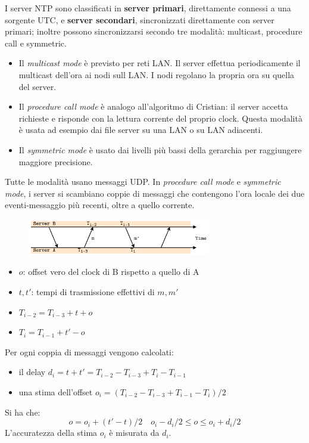 I server NTP sono classificati in \textbf{server primari}, direttamente connessi a una sorgente UTC, e \textbf{server secondari}, sincronizzati direttamente con server primari; inoltre possono sincronizzarsi secondo tre modalità: multicast, procedure call e symmetric.
\begin{itemize}
    \item Il \textit{multicast mode} è previsto per reti LAN. Il server effettua periodicamente il multicast dell'ora ai nodi sull LAN. I nodi regolano la propria ora su quella del server.
    \item Il \textit{procedure call mode} è analogo all'algoritmo di Cristian: il server accetta richieste e risponde con la lettura corrente del proprio clock. Questa modalità è usata ad esempio dai file server su una LAN o su LAN adiacenti.
    \item Il \textit{symmetric mode} è usato dai livelli più bassi della gerarchia per raggiungere maggiore precisione.
\end{itemize}
Tutte le modalità usano messaggi UDP. In \textit{procedure call mode} e \textit{symmetric mode}, i server si scambiano coppie di messaggi che contengono l'ora locale dei due eventi-messaggio più recenti, oltre a quello corrente.

\begin{figure}[ht]
    \centering
    \includegraphics[width=8cm]{./Images/cap3/3.2.png}
\end{figure}

\begin{itemize}
    \item $o$: offset vero del clock di B rispetto a quello di A
    \item $t, t'$: tempi di trasmissione effettivi di $m, m'$
    \item $T_{i-2} = T_{i-3} + t + o$
    \item $T_{i} = T_{i-1} + t' - o$
\end{itemize}
Per ogni coppia di messaggi vengono calcolati:
\begin{itemize}
    \item il delay $d_{i} = t + t' = T_{i-2} - T_{i-3} + T_{i} - T_{i-1}$
    \item una stima dell'offset $o_{i} = (T_{i-2} - T_{i-3} + T_{i-1} - T_{i})/2$
\end{itemize}
Si ha che:
\[ o = o_{i} + (t' - t)/2 \quad o_{i} - d_{i}/2 \leq o \leq o_{i} + d_{i}/2\]
L'accuratezza della stima $o_{i}$ è misurata da $d_{i}$.

